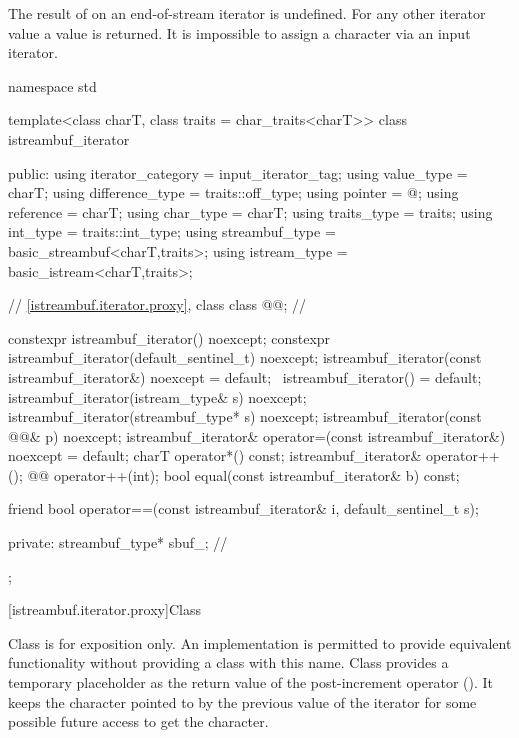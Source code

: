 \pnum
The result of
on an end-of-stream iterator is undefined.
%
For any other iterator value a
value is returned.
It is impossible to assign a character via an input iterator.

%
\begin{codeblock}
namespace std {
  template<class charT, class traits = char_traits<charT>>
  class istreambuf_iterator {
  public:
    using iterator_category = input_iterator_tag;
    using value_type        = charT;
    using difference_type   = traits::off_type;
    using pointer           = @\unspec@;
    using reference         = charT;
    using char_type         = charT;
    using traits_type       = traits;
    using int_type          = traits::int_type;
    using streambuf_type    = basic_streambuf<charT,traits>;
    using istream_type      = basic_istream<charT,traits>;

    // \ref{istreambuf.iterator.proxy}, class 
    class @@;                          // \expos

    constexpr istreambuf_iterator() noexcept;
    constexpr istreambuf_iterator(default_sentinel_t) noexcept;
    istreambuf_iterator(const istreambuf_iterator&) noexcept = default;
    ~istreambuf_iterator() = default;
    istreambuf_iterator(istream_type& s) noexcept;
    istreambuf_iterator(streambuf_type* s) noexcept;
    istreambuf_iterator(const @@& p) noexcept;
    istreambuf_iterator& operator=(const istreambuf_iterator&) noexcept = default;
    charT operator*() const;
    istreambuf_iterator& operator++();
    @@ operator++(int);
    bool equal(const istreambuf_iterator& b) const;

    friend bool operator==(const istreambuf_iterator& i, default_sentinel_t s);

  private:
    streambuf_type* sbuf_;              // \expos
  };
}
\end{codeblock}

[istreambuf.iterator.proxy]{Class }

\pnum
Class
is for exposition only.
An implementation is permitted to provide equivalent functionality without
providing a class with this name.
Class
provides a temporary
placeholder as the return value of the post-increment operator
().
It keeps the character pointed to by the previous value
of the iterator for some possible future access to get the character.

